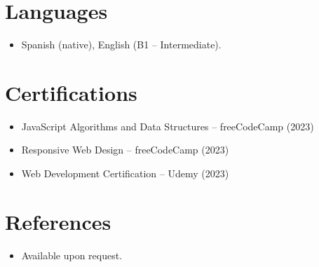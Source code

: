 \documentclass[11pt,a4paper,sans]{moderncv}
\begin{document}
\section{Languages}
\vspace{1pt}
\begin{itemize}
\item Spanish (native), English (B1 -- Intermediate).
\end{itemize}


\section{Certifications}
\vspace{1pt}
\begin{itemize}
\item JavaScript Algorithms and Data Structures -- freeCodeCamp (2023)
\item Responsive Web Design -- freeCodeCamp (2023)
\item Web Development Certification -- Udemy (2023)
\end{itemize}


\section{References}
\vspace{1pt}
\begin{itemize}
\item{Available upon request.}
\end{itemize}
\end{document}
